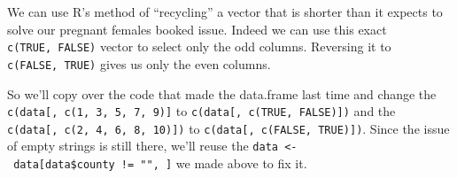 \documentclass[
]{krantz}
\makeatletter
\newenvironment{Shaded}{\begin{snugshade}}{\end{snugshade}}
\newcommand{\AttributeTok}[1]{\textcolor[rgb]{0.61,0.61,0.61}{#1}}
\newcommand{\CommentTok}[1]{\textcolor[rgb]{0.37,0.37,0.37}{\textit{#1}}}
\newcommand{\ConstantTok}[1]{\textcolor[rgb]{0,0,0}{#1}}
\newcommand{\FunctionTok}[1]{\textcolor[rgb]{0,0,0}{#1}}
\newcommand{\NormalTok}[1]{#1}
\newcommand{\OtherTok}[1]{\textcolor[rgb]{0.37,0.37,0.37}{#1}}
\newcommand{\SpecialCharTok}[1]{\textcolor[rgb]{0,0,0}{#1}}
\newcommand{\StringTok}[1]{\textcolor[rgb]{0.5,0.5,0.5}{#1}}
\newenvironment{kframe}{%
\medskip{}
\setlength{\fboxsep}{.8em}
 \def\at@end@of@kframe{}%
 \ifinner\ifhmode%
  \def\at@end@of@kframe{\end{minipage}}%
  \begin{minipage}{\columnwidth}%
 \fi\fi%
 \def\FrameCommand##1{\hskip\@totalleftmargin \hskip-\fboxsep
 \colorbox{shadecolor}{##1}\hskip-\fboxsep
     \hskip-\linewidth \hskip-\@totalleftmargin \hskip\columnwidth}%
 \MakeFramed {\advance\hsize-\width
   \@totalleftmargin\z@ \linewidth\hsize
   \@setminipage}}%
 {\par\unskip\endMakeFramed%
 \at@end@of@kframe}
\renewenvironment{Shaded}{\begin{kframe}}{\end{kframe}}
\makeatother
\begin{document}
We can use R's method of ``recycling'' a vector that is
shorter than it expects to solve our pregnant females booked
issue. Indeed we can use this exact \texttt{c(TRUE,\ FALSE)}
vector to select only the odd columns. Reversing it to
\texttt{c(FALSE,\ TRUE)} gives us only the even columns.

So we'll copy over the code that made the data.frame last
time and change the
\texttt{c(data{[},\ c(1,\ 3,\ 5,\ 7,\ 9){]}} to
\texttt{c(data{[},\ c(TRUE,\ FALSE){]})} and the
\texttt{c(data{[},\ c(2,\ 4,\ 6,\ 8,\ 10){]})} to
\texttt{c(data{[},\ c(FALSE,\ TRUE){]})}. Since the issue of
empty strings is still there, we'll reuse the
\texttt{data\ \textless{}-\ data{[}data\$county\ !=\ "",\ {]}}
we made above to fix it.

\begin{Shaded}
\end{Shaded}
\end{document}
